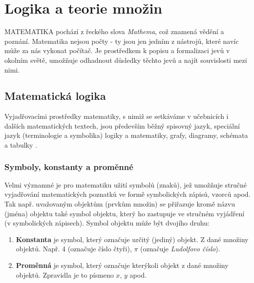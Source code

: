 \setchaptertoc
\chapter{Logika a teorie množin}\label{mai:IchapI}
  \MakeUppercase{Matematika} pochází z řeckého slova \emph{Mathema}, což znamená vědění a poznání.
  Matematika nejsou počty - ty jsou jen jedním z nástrojů, které navíc může za nás vykonat počítač.
  Je prostředkem k popisu a formalizaci jevů v okolním světě, umožňuje odhadnout důsledky těchto
  jevů a najít souvislosti mezi nimi.


  \section{Matematická logika}\label{mai:IchapIsecI}
    Vyjadřovacími prostředky matematiky, s nimiž se setkáváme v učebnicích i dalších matematických 
    textech, jsou především běžný spisovný jazyk, speciální jazyk (terminologie a symbolika) logiky 
    a matematiky, grafy, diagramy, schémata a tabulky \cite[s.~13]{polak1991matematika}.
    
    \subsection{Symboly, konstanty a proměnné}
      Velmi významné je pro matematiku užití symbolů (znaků), jež umožňuje stručné vyjadřování 
      matematických poznatků ve formě symbolických zápisů, vzorců apod. Tak např. uvažovaným 
      objektům (prvkům množin) se přiřazuje kromě názvu (jména) objektu také symbol objektu, který 
      ho zastupuje ve stručném vyjádření (v symbolických zápisech). Symbol objektu může být dvojího 
      druhu:
      \begin{enumerate}[label=\alph*), noitemsep]
        \item \textbf{Konstanta} je symbol, který označuje určitý (jediný) objekt. Z dané množiny 
              objektů. Např. 4 (označuje číslo čtyři), \(\pi\) (označuje \emph{Ludolfovo číslo}). 
        \item \textbf{Proměnná} je symbol, který označuje kterýkoli objekt z dané množiny 
              objektů. Zpravidla je to písmeno \(x\), \(y\) apod.
      \end{enumerate}
      
